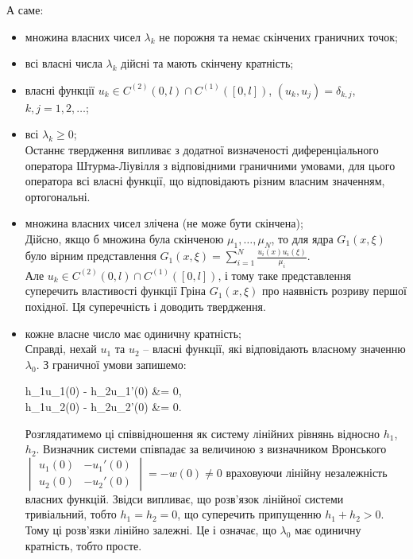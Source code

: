 А саме:
\begin{itemize}
	\item множина власних чисел $\lambda_k$ не порожня та немає скінчених граничних точок;
	\item всі власні числа $\lambda_k$ дійсні та мають скінчену кратність;
	\item власні функції $u_k\in C^{(2)}(0,l)\cap C^{(1)}([0, l])$, $(u_k, u_j) = \delta_{k,j}$, $k,j=1,2,\ldots$;
	\item всі $\lambda_k \ge 0$; \\

	Останнє твердження випливає з додатної визначеності диференціального оператора Штурма-Ліувілля з відповідними граничними умовами, для цього оператора всі власні функції, що відповідають різним власним значенням, ортогональні.

	\item множина власних чисел злічена (не може бути скінчена); \\

	Дійсно, якщо б множина була скінченою $\mu_1, \ldots, \mu_N$, то для ядра $G_1(x, \xi)$ було вірним представлення $G_1(x, \xi) = \sum_{i=1}^N \frac{u_i(x)u_i(\xi)}{\mu_i}$. \\

	Але $u_k\in C^{(2)}(0,l)\cap C^{(1)}([0, l])$, і тому таке представлення суперечить властивості функції Гріна $G_1(x, \xi)$ про наявність розриву першої похідної. Ця суперечність і доводить твердження.

	\item кожне власне число має одиничну кратність; \\

	Справді, нехай $u_1$ та $u_2$ -- власні функції, які відповідають власному значенню $\lambda_0$. З граничної умови запишемо:
	\begin{system*}
		h_1u_1(0) - h_2u_1'(0) &= 0, \\
		h_1u_2(0) - h_2u_2'(0) &= 0.
	\end{system*}

	Розглядатимемо ці співвідношення як систему лінійних рівнянь відносно $h_1$, $h_2$. Визначник системи співпадає за величиною з визначником Вронського $\begin{vmatrix} u_1(0) & -u_1'(0) \\ u_2(0) & -u_2'(0)\end{vmatrix} = -w(0) \ne 0$ враховуючи лінійну незалежність власних функцій. Звідси випливає, що розв’язок лінійної системи тривіальний, тобто $h_1 = h_2 = 0$, що суперечить припущенню $h_1 + h_2 > 0$. \\

	Тому ці розв’язки лінійно залежні. Це і означає, що $\lambda_0$ має одиничну кратність, тобто просте.
\end{itemize}

